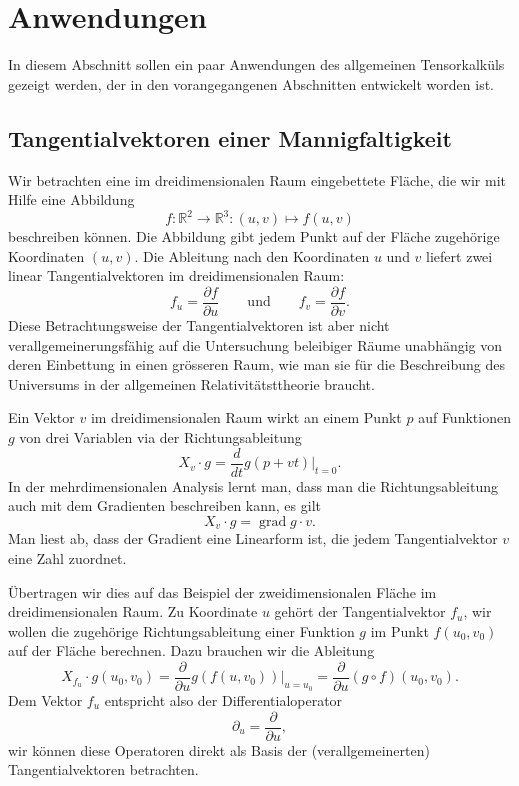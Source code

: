 %
%
%
\section{Anwendungen%
\label{section:tensor:anwendungen}}
In diesem Abschnitt sollen ein paar Anwendungen des allgemeinen
Tensorkalküls gezeigt werden, der in den vorangegangenen Abschnitten
entwickelt worden ist.

\subsection{Tangentialvektoren einer Mannigfaltigkeit%
\label{tensor:subsetion:tangentialvektoren}}
Wir betrachten eine im dreidimensionalen Raum eingebettete Fläche,
die wir mit Hilfe eine Abbildung
\[
f\colon \mathbb R^2 \to \mathbb R^3: (u,v) \mapsto f(u,v)
\]
beschreiben können.
Die Abbildung gibt jedem Punkt auf der Fläche zugehörige Koordinaten $(u,v)$.
Die Ableitung nach den Koordinaten $u$ und $v$ liefert zwei linear
Tangentialvektoren im dreidimensionalen Raum:
\[
f_u = \frac{\partial f}{\partial u}
\qquad\text{und}\qquad
f_v = \frac{\partial f}{\partial v}.
\]
Diese Betrachtungsweise der Tangentialvektoren ist aber nicht
verallgemeinerungsfähig auf die Untersuchung beleibiger Räume
unabhängig von deren Einbettung in einen grösseren Raum, wie
man sie für die Beschreibung des Universums in der allgemeinen
Relativitätsttheorie braucht.

Ein Vektor $v$ im dreidimensionalen Raum wirkt an einem Punkt $p$
auf Funktionen $g$ von drei Variablen via der Richtungsableitung
\[
X_v\cdot g
=
\frac{d}{dt}g(p+vt)\bigg|_{t=0}.
\]
In der mehrdimensionalen Analysis lernt man, dass man die Richtungsableitung
auch mit dem Gradienten beschreiben kann, es gilt
\[
X_v\cdot g
=
\operatorname{grad}g\cdot v.
\]
Man liest ab, dass der Gradient eine Linearform ist, die jedem
Tangentialvektor $v$ eine Zahl zuordnet.

Übertragen wir dies auf das Beispiel der zweidimensionalen Fläche im
dreidimensionalen Raum.
Zu Koordinate $u$ gehört der Tangentialvektor $f_u$, wir wollen die 
zugehörige Richtungsableitung einer Funktion $g$ im Punkt $f(u_0,v_0)$
auf der Fläche berechnen.
Dazu brauchen wir die Ableitung
\[
X_{f_u}\cdot g(u_0,v_0)
=
\frac{\partial}{\partial u}g(f(u,v_0)) \bigg|_{u=u_0}
=
\frac{\partial}{\partial u}(g\circ f)(u_0,v_0).
\]
Dem Vektor $f_u$ entspricht also der Differentialoperator
\[
\partial_u
=
\frac{\partial}{\partial u},
\]
wir können diese Operatoren direkt als Basis der (verallgemeinerten) 
Tangentialvektoren betrachten.

